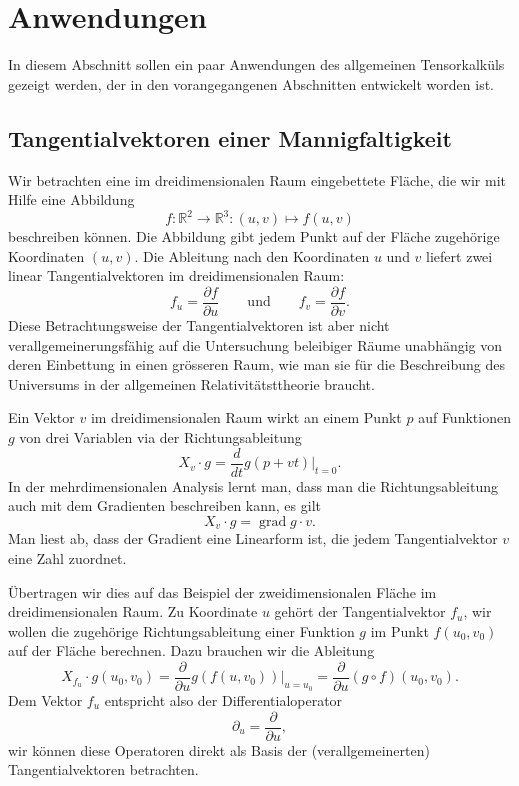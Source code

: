 %
%
%
\section{Anwendungen%
\label{section:tensor:anwendungen}}
In diesem Abschnitt sollen ein paar Anwendungen des allgemeinen
Tensorkalküls gezeigt werden, der in den vorangegangenen Abschnitten
entwickelt worden ist.

\subsection{Tangentialvektoren einer Mannigfaltigkeit%
\label{tensor:subsetion:tangentialvektoren}}
Wir betrachten eine im dreidimensionalen Raum eingebettete Fläche,
die wir mit Hilfe eine Abbildung
\[
f\colon \mathbb R^2 \to \mathbb R^3: (u,v) \mapsto f(u,v)
\]
beschreiben können.
Die Abbildung gibt jedem Punkt auf der Fläche zugehörige Koordinaten $(u,v)$.
Die Ableitung nach den Koordinaten $u$ und $v$ liefert zwei linear
Tangentialvektoren im dreidimensionalen Raum:
\[
f_u = \frac{\partial f}{\partial u}
\qquad\text{und}\qquad
f_v = \frac{\partial f}{\partial v}.
\]
Diese Betrachtungsweise der Tangentialvektoren ist aber nicht
verallgemeinerungsfähig auf die Untersuchung beleibiger Räume
unabhängig von deren Einbettung in einen grösseren Raum, wie
man sie für die Beschreibung des Universums in der allgemeinen
Relativitätsttheorie braucht.

Ein Vektor $v$ im dreidimensionalen Raum wirkt an einem Punkt $p$
auf Funktionen $g$ von drei Variablen via der Richtungsableitung
\[
X_v\cdot g
=
\frac{d}{dt}g(p+vt)\bigg|_{t=0}.
\]
In der mehrdimensionalen Analysis lernt man, dass man die Richtungsableitung
auch mit dem Gradienten beschreiben kann, es gilt
\[
X_v\cdot g
=
\operatorname{grad}g\cdot v.
\]
Man liest ab, dass der Gradient eine Linearform ist, die jedem
Tangentialvektor $v$ eine Zahl zuordnet.

Übertragen wir dies auf das Beispiel der zweidimensionalen Fläche im
dreidimensionalen Raum.
Zu Koordinate $u$ gehört der Tangentialvektor $f_u$, wir wollen die 
zugehörige Richtungsableitung einer Funktion $g$ im Punkt $f(u_0,v_0)$
auf der Fläche berechnen.
Dazu brauchen wir die Ableitung
\[
X_{f_u}\cdot g(u_0,v_0)
=
\frac{\partial}{\partial u}g(f(u,v_0)) \bigg|_{u=u_0}
=
\frac{\partial}{\partial u}(g\circ f)(u_0,v_0).
\]
Dem Vektor $f_u$ entspricht also der Differentialoperator
\[
\partial_u
=
\frac{\partial}{\partial u},
\]
wir können diese Operatoren direkt als Basis der (verallgemeinerten) 
Tangentialvektoren betrachten.

